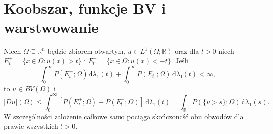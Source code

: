 \section{Koobszar, funkcje BV i warstwowanie}
\begin{twierdzenie}
\label{thm:BV-layercake-29}
Niech $\Omega\subseteq\mathbb R^n$ będzie zbiorem otwartym,
$u\in L^1(\Omega;\mathbb R)$ oraz dla $t>0$
niech $E_t^+=\{x\in\Omega:u(x)>t\}$ i
$E_t^-=\{x\in\Omega:u(x)<-t\}$.
Jeśli
\[
 \int_0^\infty\!P(E_t^+;\Omega)\,\mathrm d\lambda_1(t)
 +\int_0^\infty\!P(E_t^-;\Omega)\,\mathrm d\lambda_1(t)<\infty,
\]
to $u\in BV(\Omega)$ i
\[
 |Du|(\Omega)\le\int_0^\infty
 [P(E_t^+;\Omega)+P(E_t^-;\Omega)]\,
 \mathrm d\lambda_1(t)
 =\int_{\mathbb R}P(\{u>s\};\Omega)
 \,\mathrm d\lambda_1(s).
\]
W szczególności założenie całkowe samo pociąga
skończoność obu obwodów dla prawie wszystkich $t>0$.
\end{twierdzenie}
